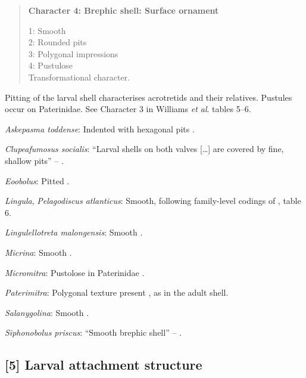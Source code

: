 \documentclass[openany]{book}
\theoremstyle{definition}
\theoremstyle{definition}
\theoremstyle{definition}
\theoremstyle{remark}
\begin{document}
\begin{quote}
\textbf{Character 4: Brephic shell: Surface ornament}

1: Smooth\\
2: Rounded pits\\
3: Polygonal impressions\\
4: Pustulose\\
Transformational character.
\end{quote}

Pitting of the larval shell characterises acrotretids and their
relatives. Pustules occur on Paterinidae. See Character 3 in Williams
\emph{et al}. \citeyearpar{Williams2000LinguliformeaCraniiformea} tables
5--6.

\hypertarget{Askepasma_toddense-coding-4}{}
\emph{Askepasma toddense}: Indented with hexagonal pits \citep[appendix
2]{Williams1998Thediversity}.

\hypertarget{Clupeafumosus_socialis-coding-4}{}
\emph{Clupeafumosus socialis}: ``Larval shells on both valves
{[}\ldots{}{]} are covered by fine, shallow pits'' --
\citet{Topper2013Reappraisalof}.

\hypertarget{Eoobolus-coding-4}{}
\emph{Eoobolus}: Pitted \citep[table
8]{Williams2000LinguliformeaCraniiformea}.

\hypertarget{Lingula-coding-4}{}
\emph{Lingula}, \emph{Pelagodiscus atlanticus}: Smooth, following
family-level codings of \citet{Williams2000LinguliformeaCraniiformea},
table 6.

\hypertarget{Lingulellotreta_malongensis-coding-4}{}
\emph{Lingulellotreta malongensis}: Smooth
\citep{Holmer1997EarlyCambrian, Li2004}.

\hypertarget{Micrina-coding-4}{}
\emph{Micrina}: Smooth \citep{Holmer2011Firstrecord}.

\hypertarget{Micromitra-coding-4}{}
\emph{Micromitra}: Pustolose in Paterinidae \citep[table
6]{Williams2000LinguliformeaCraniiformea}.

\hypertarget{Paterimitra-coding-4}{}
\emph{Paterimitra}: Polygonal texture present
\citep{Holmer2011Firstrecord}, as in the adult shell.

\hypertarget{Salanygolina-coding-4}{}
\emph{Salanygolina}: Smooth \citep{Holmer2009Theenigmatic}.

\hypertarget{Siphonobolus_priscus-coding-4}{}
\emph{Siphonobolus priscus}: ``Smooth brephic shell'' --
\citet{Popov2009Earlyontogeny}.

\subsection*{{[}5{]} Larval attachment
structure}\label{larval-attachment-structure}
\end{document}
